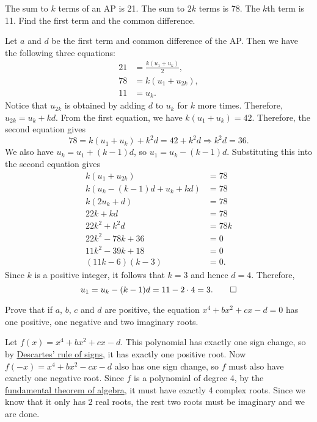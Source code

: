 \begin{question}
    The sum to $k$ terms of an AP is 21. The sum to $2k$ terms is 78. The $k$th
    term is 11. Find the first term and the common difference. 
\end{question}
\begin{solution}
    Let $a$ and $d$ be the first term and common difference of the AP. 
    Then we have the following three equations:
    \begin{align*}
        21 &= \frac{k(u_1 + u_k)}{2},\\
        78 &= k(u_1 + u_{2k}),\\
        11 &= u_k.
    \end{align*}
    Notice that $u_{2k}$ is obtained by adding $d$ to $u_k$ for $k$ more times.
    Therefore, $u_{2k} = u_k + kd$. From the first equation, we have $k(u_1 +
    u_k) = 42$. Therefore, the second equation gives
    \[ 78 = k(u_1 + u_k) + k^2d = 42 + k^2d \Longrightarrow k^2d = 36. \]
    We also have $u_k = u_1 + (k - 1)d$, so $u_1 = u_k - (k - 1)d$.
    Substituting this into the second equation gives
    \begin{align*}
        k(u_1 + u_{2k}) &= 78\\
        k(u_k - (k - 1)d + u_k + kd) &= 78\\
        k(2u_k + d) &= 78\\
        22k + kd &= 78\\
        22k^2 + k^2d &= 78k\\
        22k^2 - 78k + 36 &= 0\\
        11k^2 - 39k + 18 &= 0\\
        (11k - 6)(k - 3) &= 0.
    \end{align*}
    Since $k$ is a positive integer, it follows that $k = 3$ and hence $d = 4$.
    Therefore,
    \[ u_1 = u_k - (k - 1)d = 11 - 2\cdot 4 = 3. \qedhere \]
\end{solution}

\begin{question}
    Prove that if $a$, $b$, $c$ and $d$ are positive, the equation $x^4 + bx^2
    + cx - d = 0$ has one positive, one negative and two imaginary roots.
\end{question}
\begin{solution}
    Let $f(x) = x^4 + bx^2 + cx - d$. This polynomial has exactly one sign
    change, so by \hyperref[thm: ruleofsigns]{Descartes' rule of signs}, it has
    exactly one positive root. Now $f(-x) = x^4 + bx^2 - cx - d$ also has one
    sign change, so $f$ must also have exactly one negative root. Since $f$ is
    a polynomial of degree 4, by the \hyperref[thm:
    fundamentalthmofalg]{fundamental theorem of algebra}, it must have exactly
    4 complex roots. Since we know that it only has 2 real roots, the rest two
    roots must be imaginary and we are done.
\end{solution}

